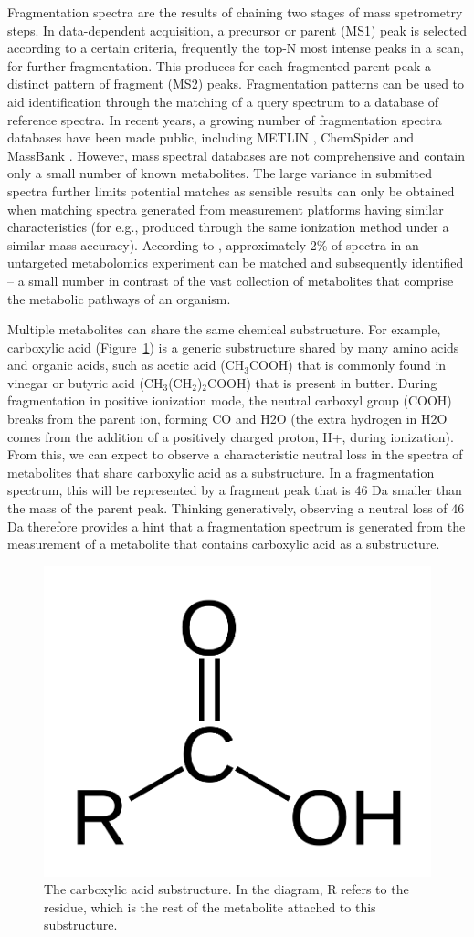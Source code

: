 Fragmentation spectra are the results of chaining two stages of mass spetrometry steps. In data-dependent acquisition, a precursor or parent (MS1) peak is selected according to a certain criteria, frequently the top-N most intense peaks in a scan, for further fragmentation. This produces for each fragmented parent peak a distinct pattern of fragment (MS2) peaks. Fragmentation patterns can be used to aid identification through the matching of a query spectrum to a database of reference spectra. In recent years, a growing number of fragmentation spectra databases have been made public, including METLIN \cite{Smith2005}, ChemSpider \cite{pence2010chemspider} and MassBank \cite{horai2010massbank}. However, mass spectral databases are not comprehensive and contain only a small number of known metabolites. The large variance in submitted spectra further limits potential matches as sensible results can only be obtained when matching spectra generated from measurement platforms having similar characteristics (for e.g., produced through the same ionization method under a similar mass accuracy). According to \cite{DaSilva2015}, approximately 2\% of spectra in an untargeted metabolomics experiment can be matched and subsequently identified -- a small number in contrast of the vast collection of metabolites that comprise the metabolic pathways of an organism.

Multiple metabolites can share the same chemical substructure. For example, carboxylic acid (Figure~\ref{fig:cooh}) is a generic substructure shared by many amino acids and organic acids, such as acetic acid (CH$_3$COOH) that is commonly found in vinegar or butyric acid (CH$_3$(CH$_2$)$_2$COOH) that is present in butter. During fragmentation in positive ionization mode, the neutral carboxyl group (COOH) breaks from the parent ion, forming CO and H2O (the extra hydrogen in H2O comes from the addition of a positively charged proton, H+, during ionization). From this, we can expect to observe a characteristic neutral loss in the spectra of metabolites that share carboxylic acid as a substructure. In a fragmentation spectrum, this will be represented by a fragment peak that is 46 Da smaller than the mass of the parent peak. Thinking generatively, observing a neutral loss of 46 Da therefore provides a hint that a fragmentation spectrum is generated from the measurement of a metabolite that contains carboxylic acid as a substructure.

\begin{figure}[!htbp]
\centering\includegraphics[width=0.2\linewidth]{07-lda/figures/927px-Carboxylic-acid.png}
\centering\caption{The carboxylic acid substructure. In the diagram, R refers to the residue, which is the rest of the metabolite attached to this substructure.\label{fig:cooh}}
\end{figure}

